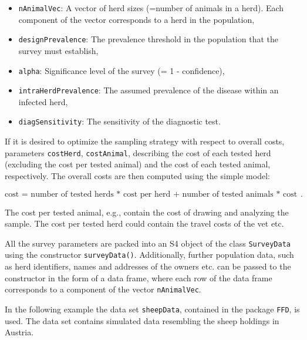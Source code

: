 \documentclass[nojss]{jss}
\begin{document}
\begin{itemize} 
% 
\item \texttt{nAnimalVec}: A vector of herd sizes (=number of
animals in a herd). Each component of the vector corresponds to a herd 
in the population,
\item \texttt{designPrevalence}: The prevalence threshold in the population
that the survey must establish,
\item \texttt{alpha}: Significance level of the survey (= 1 - confidence),
\item \texttt{intraHerdPrevalence}: The assumed prevalence of the 
disease within an infected herd,
\item \texttt{diagSensitivity}: The sensitivity of the diagnostic test.
%
\end{itemize} 

If it is desired to optimize the sampling strategy with respect to 
overall costs, parameters \texttt{costHerd}, \texttt{costAnimal}, 
describing the cost of each tested herd (excluding the cost per 
tested animal) and the cost of each tested animal, respectively. The 
overall costs are then computed using the simple model:

$$\mbox{cost = number of tested herds * cost per herd + number of 
tested animals * cost per animal}.$$ 
 
The cost per tested animal, e.g., contain the cost of drawing and 
analyzing the sample. The cost per tested herd could contain the 
travel costs of the vet etc.

All the survey parameters are packed into an S4 object of the class 
\texttt{SurveyData}  
  using the constructor 
\texttt{surveyData()}.  Additionally, 
further population data, such as herd identifiers, names and 
addresses of the owners etc. can be passed to the constructor in the 
form of a data frame, where each row of the data frame corresponds 
to a component of the vector \texttt{nAnimalVec}. 

In the following example the data set \texttt{sheepData}, contained 
in the package \texttt{FFD}, is used. The data set contains 
simulated data resembling the sheep holdings in Austria. 

 
\end{document}

